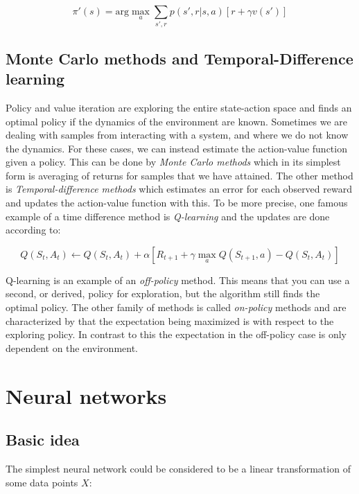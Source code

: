 \begin{equation}
    \pi'(s) = \text{arg}\max_a \sum_{s', r} p(s', r|s, a) \left[r + \gamma v(s')\right]
\end{equation}

\subsection{Monte Carlo methods and Temporal-Difference learning}

Policy and value iteration are exploring the entire state-action space and
finds an optimal policy if the dynamics of the environment are known. Sometimes
we are dealing with samples from interacting with a system, and where we do not
know the dynamics. For these cases, we can instead estimate the action-value
function given a policy. This can be done by \textit{Monte Carlo methods} which
in its simplest form is averaging of returns for samples that we have attained.
The other method is \textit{Temporal-difference methods} which estimates an error
for each observed reward and updates the action-value function with this. To be
more precise, one famous example of a time difference method is
\textit{Q-learning} and the updates are done according to:

\begin{equation}
    Q(S_t, A_t) \leftarrow Q(S_t, A_t) + \alpha \left[ R_{t+1} + \gamma \max_a Q(S_{t+1}, a) - Q(S_t, A_t) \right]
\end{equation}

Q-learning is an example of an \textit{off-policy} method. This means that you
can use a second, or derived, policy for exploration, but the algorithm still
finds the optimal policy. The other family of methods is called
\textit{on-policy} methods and are characterized by that the expectation being
maximized is with respect to the exploring policy. In contrast to this the
expectation in the off-policy case is only dependent on the environment.

\section{Neural networks}

\subsection{Basic idea}

The simplest neural network could be considered to be a linear transformation
of some data points $X$:

